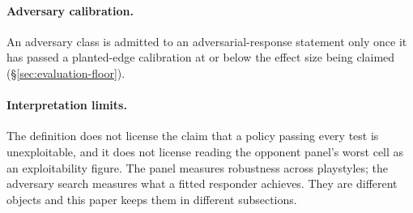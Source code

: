 \paragraph{Adversary calibration.} An adversary class is admitted to an adversarial-response
statement only once it has passed a planted-edge calibration at or below the effect size being
claimed (\S\ref{sec:evaluation-floor}).

\paragraph{Interpretation limits.} The definition does not license the claim that a policy passing
every test is unexploitable, and it does not license reading the opponent panel's worst cell as an
exploitability figure. The panel measures robustness across playstyles; the adversary search measures
what a fitted responder achieves. They are different objects and this paper keeps them in different
subsections.
